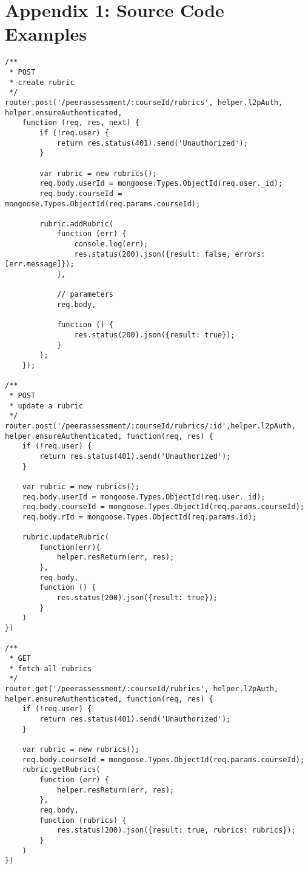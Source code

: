 \chapter{Appendix 1: Source Code Examples}
\label{appendix:listing1}

\lstset{
 language=JAVASCRIPT,
 captionpos=t
}
\begin{lstlisting}[caption=Example of rubric controller]
/**
 * POST
 * create rubric
 */
router.post('/peerassessment/:courseId/rubrics', helper.l2pAuth, helper.ensureAuthenticated,
    function (req, res, next) {
        if (!req.user) {
            return res.status(401).send('Unauthorized');
        }

        var rubric = new rubrics();
        req.body.userId = mongoose.Types.ObjectId(req.user._id);
        req.body.courseId = mongoose.Types.ObjectId(req.params.courseId);

        rubric.addRubric(
            function (err) {
                console.log(err);
                res.status(200).json({result: false, errors: [err.message]});
            },

            // parameters
            req.body,

            function () {
                res.status(200).json({result: true});
            }
        );
    });

/**
 * POST
 * update a rubric
 */
router.post('/peerassessment/:courseId/rubrics/:id',helper.l2pAuth, helper.ensureAuthenticated, function(req, res) {
    if (!req.user) {
        return res.status(401).send('Unauthorized');
    }

    var rubric = new rubrics();
    req.body.userId = mongoose.Types.ObjectId(req.user._id);
    req.body.courseId = mongoose.Types.ObjectId(req.params.courseId);
    req.body.rId = mongoose.Types.ObjectId(req.params.id);

    rubric.updateRubric(
        function(err){
            helper.resReturn(err, res);
        },
        req.body,
        function () {
            res.status(200).json({result: true});
        }
    )
})

/**
 * GET
 * fetch all rubrics
 */
router.get('/peerassessment/:courseId/rubrics', helper.l2pAuth, helper.ensureAuthenticated, function(req, res) {
    if (!req.user) {
        return res.status(401).send('Unauthorized');
    }

    var rubric = new rubrics();
    req.body.courseId = mongoose.Types.ObjectId(req.params.courseId);
    rubric.getRubrics(
        function (err) {
            helper.resReturn(err, res);
        },
        req.body,
        function (rubrics) {
            res.status(200).json({result: true, rubrics: rubrics});
        }
    )
})


\end{lstlisting}
